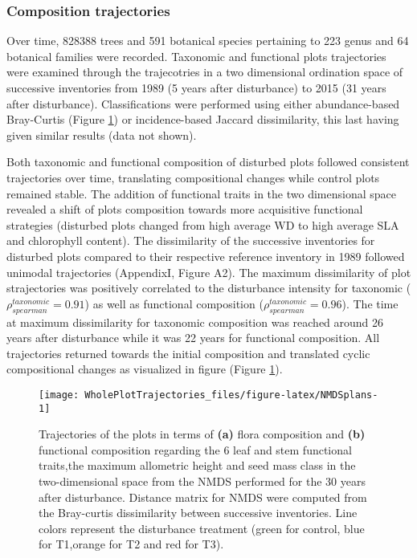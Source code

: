 \documentclass[fleqn,10pt]{ArtEcoFoG} %
\theoremstyle{definition}
\theoremstyle{definition}
\theoremstyle{definition}
\theoremstyle{remark}
\begin{document}
\subsubsection{Composition trajectories}\label{composition-trajectories}

Over time, 828388 trees and 591 botanical species pertaining to 223
genus and 64 botanical families were recorded. Taxonomic and functional
plots trajectories were examined through the trajecotries in a two
dimensional ordination space of successive inventories from 1989 (5
years after disturbance) to 2015 (31 years after disturbance).
Classifications were performed using either abundance-based Bray-Curtis
(Figure \ref{fig:NMDSplans}) or incidence-based Jaccard dissimilarity,
this last having given similar results (data not shown).

Both taxonomic and functional composition of disturbed plots followed
consistent trajectories over time, translating compositional changes
while control plots remained stable. The addition of functional traits
in the two dimensional space revealed a shift of plots composition
towards more acquisitive functional strategies (disturbed plots changed
from high average WD to high average SLA and chlorophyll content). The
dissimilarity of the successive inventories for disturbed plots compared
to their respective reference inventory in 1989 followed unimodal
trajectories (AppendixI, Figure A2). The maximum dissimilarity of plot
strajectories was positively correlated to the disturbance intensity for
taxonomic (\(\rho_{spearman}^{taxonomic}=0.91\)) as well as functional
composition (\(\rho_{spearman}^{taxonomic}=0.96\)). The time at maximum
dissimilarity for taxonomic composition was reached around 26 years
after disturbance while it was 22 years for functional composition. All
trajectories returned towards the initial composition and translated
cyclic compositional changes as visualized in figure (Figure
\ref{fig:NMDSplans}).

\begin{figure}

{\centering \texttt{[image: WholePlotTrajectories\_files/figure-latex/NMDSplans-1]} 

}

\caption{Trajectories of the plots in terms of \textbf{(a)} flora composition and \textbf{(b)} functional composition regarding the 6 leaf and stem functional traits,the maximum allometric height and seed mass class in the two-dimensional space from the NMDS performed for the 30 years after disturbance. Distance matrix for NMDS were computed from the Bray-curtis dissimilarity between successive inventories. Line colors represent the disturbance treatment (green for control, blue for T1,orange for T2 and red for T3).}\label{fig:NMDSplans}
\end{figure}
\end{document}
